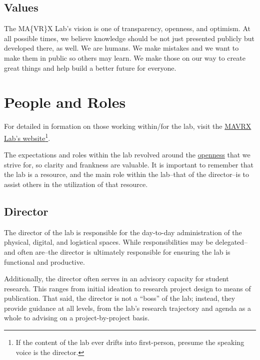 \documentclass[
]{book}
\begin{document}
\hypertarget{values}{%
\section*{Values}\label{values}}

The MA\{VR\}X Lab's vision is one of transparency, openness, and optimism. At all possible times, we believe knowledge should be not just presented publicly but developed there, as well. We are humans. We make mistakes and we want to make them in public so others may learn. We make those on our way to create great things and help build a better future for everyone.

\hypertarget{people}{%
\chapter{People and Roles}\label{people}}

For detailed in formation on those working within/for the lab, visit the \href{https://mavrxlab.org/people}{MAVRX Lab's website}\footnote{If the content of the lab ever drifts into first-person, presume the speaking voice is the director.}.

The expectations and roles within the lab revolved around the \protect\hyperlink{openness}{openness} that we strive for, so clarity and frankness are valuable. It is important to remember that the lab is a resource, and the main role within the lab--that of the director--is to assist others in the utilization of that resource.

\hypertarget{director}{%
\section{Director}\label{director}}

The director of the lab is responsible for the day-to-day administration of the physical, digital, and logistical spaces. While responsibilities may be delegated--and often are--the director is ultimately responsible for ensuring the lab is functional and productive.

Additionally, the director often serves in an advisory capacity for student research. This ranges from initial ideation to research project design to means of publication. That said, the director is not a ``boss'' of the lab; instead, they provide guidance at all levels, from the lab's research trajectory and agenda as a whole to advising on a project-by-project basis.
\end{document}
